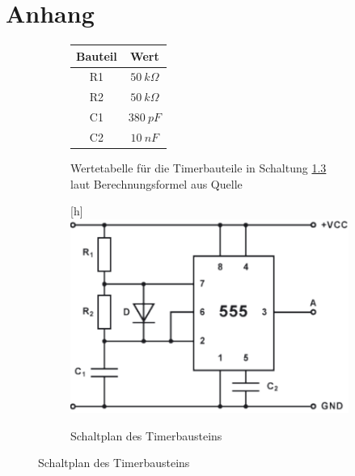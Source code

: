 \chapter{Anhang}
\label{ch:anhang}

\begin{figure}[h]
	\vspace{2cm}
	\begin{subfigure}{\textwidth}
		\centering
		\begin{tabular}{|c|c|}
			\hline Bauteil & Wert \\ 
			\hline R1 & $50 \ k\Omega$ \\ 
			\hline R2 & $50 \ k\Omega$ \\ 
			\hline C1 & $380 \ pF$ \\ 
			\hline C2 & $10 \ nF$ \\ 
			\hline 
		\end{tabular} 
		\caption{Wertetabelle für die Timerbauteile in Schaltung \ref{fig:schaltplan_ne555} laut Berechnungsformel aus Quelle \cite{ELKO}}
		\label{fig:wertetabelle_ne555}
	\end{subfigure}
	\par\bigskip
	\vspace{1.5cm}
	\centering
	\begin{subfigure}{\textwidth}[h]
		\includegraphics[height=.4\textheight]{images/ne555_astabile_kippstufe.pdf}
		\caption{Schaltplan des Timerbausteins \cite{ELKO}}
		\label{fig:schaltplan_ne555}
	\end{subfigure}
\end{figure}
